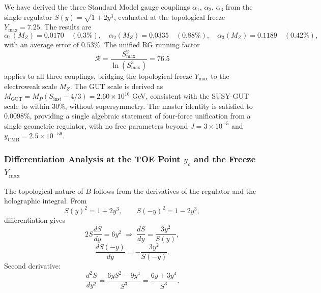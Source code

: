 \documentclass[12pt,oneside,openany]{book}
\begin{document}
We have derived the three Standard Model gauge couplings $\alpha_1$, $\alpha_2$, $\alpha_3$ from the single regulator $S(y) = \sqrt{1 + 2y^3}$, evaluated at the topological freeze $Y_{\max} = 7.25$. The results are
\begin{equation}
\alpha_1(M_Z) = 0.0170 \quad (0.3\%), \quad \alpha_2(M_Z) = 0.0335 \quad (0.88\%), \quad \alpha_3(M_Z) = 0.1189 \quad (0.42\%),
\label{eq:final-gut}
\end{equation}
with an average error of $0.53\%$. The unified RG running factor
\begin{equation}
\mathcal{R} = \frac{S_{\max}^2}{\ln(S_{\max}^3)} = 76.5
\label{eq:final-R}
\end{equation}
applies to all three couplings, bridging the topological freeze $Y_{\max}$ to the electroweak scale $M_Z$. The GUT scale is derived as $M_{\mathrm{GUT}} = M_P(S_{\mathrm{inst}} - 4/3) = 2.60 \times 10^{16}$ GeV, consistent with the SUSY-GUT scale to within $30\%$, without supersymmetry. The master identity is satisfied to $0.0098\%$, providing a single algebraic statement of four-force unification from a single geometric regulator, with no free parameters beyond $J = 3 \times 10^{-5}$ and $y_{\mathrm{CMB}} = 2.5 \times 10^{-59}$.
\subsubsection{Differentiation Analysis at the TOE Point $y_c$ and the Freeze $Y_{\max}$}
\label{sec:differentiation-toe}

The topological nature of $B$ follows from the derivatives of the
regulator and the holographic integral. From
\begin{equation}
S(y)^2 = 1+2y^3,\qquad S(-y)^2 = 1-2y^3,
\end{equation}
differentiation gives
\begin{equation}
2S\frac{dS}{dy}=6y^2 \;\Longrightarrow\;
\boxed{\frac{dS}{dy}= \frac{3y^2}{S(y)}},
\label{eq:dSdy}
\end{equation}
\begin{equation}
\boxed{\frac{dS(-y)}{dy}= -\frac{3y^2}{S(-y)}}.
\label{eq:dSminusdy}
\end{equation}
Second derivative:
\begin{equation}
\frac{d^2S}{dy^2}= \frac{6yS^2-9y^4}{S^3}= \frac{6y+3y^4}{S^3}.
\label{eq:d2Sdy2}
\end{equation}
\end{document}
